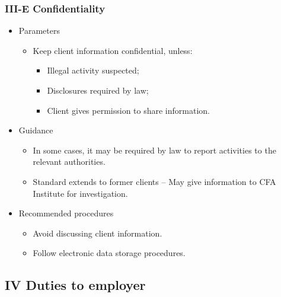 \documentclass[../notes_compiled.tex]{subfiles}
\begin{document}
\subsubsection{III-E Confidentiality}
\begin{itemize}
\item Parameters
\begin{itemize}
\item Keep client information confidential, unless:
\begin{itemize}
\item Illegal activity suspected;
\item Disclosures required by law;
\item Client gives permission to share information.
\end{itemize}
\end{itemize}
\item Guidance
\begin{itemize}
\item In some cases, it may be required by law to report activities to the relevant authorities.
\item Standard extends to former clients -- May give information to CFA Institute for investigation.
\end{itemize}
\item Recommended procedures
\begin{itemize}
\item Avoid discussing client information.
\item Follow electronic data storage procedures.
\end{itemize}
\end{itemize}
\subsection{IV Duties to employer}
\end{document}
